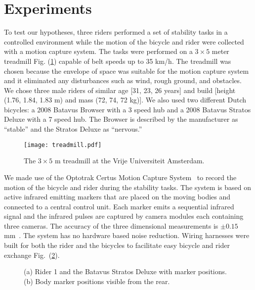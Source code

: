 \documentclass[smallextended]{svjour3}     %
\begin{document}
\section{Experiments}
\label{sec:exp}
To test our hypotheses, three riders performed a set of stability tasks in a
controlled environment while the motion of the bicycle and rider were collected
with a motion capture system. The tasks were performed on a $3\times5$ meter
treadmill Fig. (\ref{fig:treadmill}) capable of belt speeds up to 35 km/h. The
treadmill was chosen because the envelope of space was suitable for the motion
capture system and it eliminated any disturbances such as wind, rough ground,
and obstacles.  We chose three male riders of similar age [31, 23, 26 years] and
build [height (1.76, 1.84, 1.83 m) and mass (72, 74, 72 kg)]. We also used two
different Dutch bicycles: a 2008 Batavus
Browser with a 3 speed hub and a 2008 Batavus Stratos Deluxe with a 7 speed
hub. The Browser is described by the manufacturer as ``stable'' and the Stratos
Deluxe as ``nervous.''
\begin{figure}
    \centering
        \texttt{[image: treadmill.pdf]}
    \caption{The $3\times5$ m treadmill at the Vrije Universiteit Amsterdam.}
    \label{fig:treadmill}
\end{figure}

We made use of the Optotrak Certus Motion Capture
System~\cite{NorthernDigitalIncorporated2009} to record the motion of the
bicycle and rider during the stability tasks. The system is based on active
infrared emitting markers that are placed on the moving bodies and connected to
a central control unit. Each marker emits a sequential infrared signal and the
infrared pulses are captured by camera modules each
containing three cameras. The accuracy of the three dimensional measurements is
$\pm0.15$ mm~\cite{NorthernDigitalIncorporated2009}.
The system has no hardware based noise reduction. Wiring
harnesses were built for both the rider and the bicycles to facilitate easy
bicycle and rider exchange Fig.~(\ref{fig:markers}).
\begin{figure}
    \centering
    \caption{(a) Rider 1 and the Batavus Stratos Deluxe with marker positions. (b) Body marker positions visible from the rear.}
    \label{fig:markers}
\end{figure}
\end{document}
